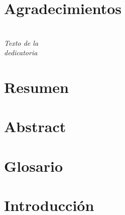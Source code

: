 \section*{Agradecimientos}

\newpage
\thispagestyle{empty}
\cleardoublepage
\pagestyle{fancy}

\section*{}
\begin{flushright}
\vspace {13cm}
\textit{\large Texto de la \\dedicatoria}\\[1.5cm]
\end{flushright}
\newpage
\thispagestyle{empty}
\cleardoublepage
\pagestyle{fancy}

\section*{Resumen}

\newpage
\thispagestyle{empty}
\cleardoublepage
\pagestyle{fancy}

\section*{Abstract}

\newpage
\thispagestyle{empty}
\cleardoublepage
\pagestyle{fancy}

\section*{Glosario}

\newpage
\thispagestyle{empty}
\cleardoublepage
\pagestyle{fancy}

\section*{Introducción}

\newpage
\thispagestyle{empty}
\cleardoublepage
\pagestyle{fancy}
